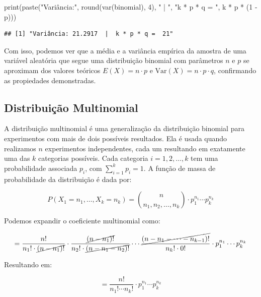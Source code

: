 \documentclass[
]{article}
\newenvironment{Shaded}{\begin{snugshade}}{\end{snugshade}}
\newcommand{\DecValTok}[1]{\textcolor[rgb]{0.00,0.00,0.81}{#1}}
\newcommand{\FunctionTok}[1]{\textcolor[rgb]{0.00,0.00,0.00}{#1}}
\newcommand{\NormalTok}[1]{#1}
\newcommand{\SpecialCharTok}[1]{\textcolor[rgb]{0.00,0.00,0.00}{#1}}
\newcommand{\StringTok}[1]{\textcolor[rgb]{0.31,0.60,0.02}{#1}}
\begin{document}
\begin{Shaded}
\begin{Highlighting}[]
\FunctionTok{print}\NormalTok{(}\FunctionTok{paste}\NormalTok{(}\StringTok{"Variância:"}\NormalTok{, }\FunctionTok{round}\NormalTok{(}\FunctionTok{var}\NormalTok{(binomial), }\DecValTok{4}\NormalTok{), }\StringTok{" | "}\NormalTok{, }\StringTok{"k * p * q = "}\NormalTok{, k }\SpecialCharTok{*}\NormalTok{ p }\SpecialCharTok{*}\NormalTok{ (}\DecValTok{1} \SpecialCharTok{{-}}\NormalTok{ p)))}
\end{Highlighting}
\end{Shaded}

\begin{verbatim}
## [1] "Variância: 21.2917  |  k * p * q =  21"
\end{verbatim}

Com isso, podemos ver que a média e a variância empírica da amostra de uma variável aleatória que segue uma distribuição binomial com parâmetros \(n\) e \(p\) se aproximam dos valores teóricos \(E(X) = n \cdot p\) e \(\text{Var}(X) = n \cdot p \cdot q\), confirmando as propiedades demonstradas.

\hypertarget{distribuiuxe7uxe3o-multinomial}{%
\subsection{Distribuição Multinomial}\label{distribuiuxe7uxe3o-multinomial}}

A distribuição multinomial é uma generalização da distribuição binomial para experimentos com mais de dois possíveis resultados. Ela é usada quando realizamos \(n\) experimentos independentes, cada um resultando em exatamente uma das \(k\) categorias possíveis. Cada categoria \(i = 1, 2, \ldots, k\) tem uma probabilidade associada \(p_i\), com \(\sum_{i=1}^{k} p_i = 1\). A função de massa de probabilidade da distribuição é dada por:

\[
P(X_1 = n_1, \ldots, X_k = n_k) = \binom{n}{n_1, n_2, \ldots, n_k} \cdot p_1^{n_1} \cdots p_k^{n_k}
\]

Podemos expandir o coeficiente multinomial como:

\[
= \frac{n!}{n_1! \cdot \cancel{(n - n_1)!}} \cdot \frac{\cancel{(n - n_1)!}}{n_2! \cdot \cancel{(n - n_1 - n_2)!}} \cdots \frac{\cancel{(n - n_1 - \cdots - n_{k-1})!}}{n_k! \cdot 0!}
\cdot p_1^{n_1} \cdots p_k^{n_k}
\]

Resultando em:

\[
= \frac{n!}{n_1! \cdots n_k!} \cdot p_1^{n_1} \cdots p_k^{n_k}
\]
\end{document}
